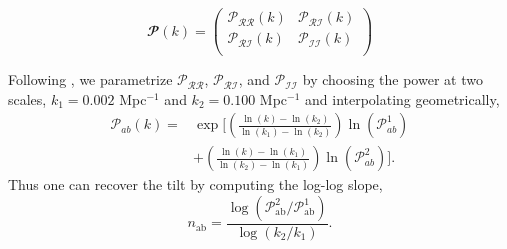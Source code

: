 \documentclass{emulateapj}
\newcommand\prr{ \mathcal{P}_{\mathcal{R}\mathcal{R}} }
\newcommand\pri{ \mathcal{P}_{\mathcal{R}\mathcal{I}} }
\newcommand\pii{ \mathcal{P}_{\mathcal{I}\mathcal{I}} }
\begin{document}
\begin{equation}
\mathbfcal{P}(k) = \left( {\begin{array}{cc}
   \prr(k) & \pri(k) \\
   \pri(k) &  \pii(k) \\
  \end{array} } \right)
\end{equation}

Following \cite{planckXX:2015}, we parametrize $\prr$, $\pri$, and $\pii$ by choosing the power at two scales, $k_1 = 0.002$ Mpc$^{-1}$ and $k_2 = 0.100$ Mpc$^{-1}$ and interpolating geometrically,
\begin{align*}
\mathcal{P}_{ab}(k) = & \exp \bigg[ \left( \frac{\ln(k) - \ln(k_2)}{\ln(k_1) - \ln(k_2)}\right) \ln \left( \mathcal{P}_{ab}^1 \right) \\
& +
\left( \frac{\ln(k) - \ln(k_1)}{\ln(k_2) - \ln(k_1)}\right) \ln \left( \mathcal{P}_{ab}^2 \right) \bigg].
\end{align*}
Thus one can recover the tilt by computing the log-log slope,
\begin{equation} n_{\text{ab}}  =  \frac{\log( \mathcal{P}_{\text{ab}}^2 / \mathcal{P}_{\text{ab}}^1 )}{\log ( k_2 / k_1 )}. \end{equation}
\end{document}
